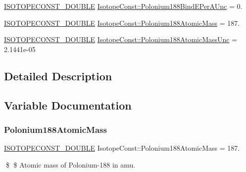 \begin{DoxyCompactItemize}
\mbox{\hyperlink{group___isotope_const-_macros_ga8f45a7272ce02c0b4c65c44636ed719a}{I\+S\+O\+T\+O\+P\+E\+C\+O\+N\+S\+T\+\_\+\+D\+O\+U\+B\+LE}} \mbox{\hyperlink{group___isotope_const-_polonium-_po188_ga11160d514e5717e0207f0b3419f30ae1}{Isotope\+Const\+::\+Polonium188\+Bind\+E\+Per\+A\+Unc}} = 0.
\item 
\mbox{\hyperlink{group___isotope_const-_macros_ga8f45a7272ce02c0b4c65c44636ed719a}{I\+S\+O\+T\+O\+P\+E\+C\+O\+N\+S\+T\+\_\+\+D\+O\+U\+B\+LE}} \mbox{\hyperlink{group___isotope_const-_polonium-_po188_ga9f07adc921625762b4d1d325d576fac6}{Isotope\+Const\+::\+Polonium188\+Atomic\+Mass}} = 187.
\item 
\mbox{\hyperlink{group___isotope_const-_macros_ga8f45a7272ce02c0b4c65c44636ed719a}{I\+S\+O\+T\+O\+P\+E\+C\+O\+N\+S\+T\+\_\+\+D\+O\+U\+B\+LE}} \mbox{\hyperlink{group___isotope_const-_polonium-_po188_ga6f831f0b8b53b4d3debe7c4c7ba841dd}{Isotope\+Const\+::\+Polonium188\+Atomic\+Mass\+Unc}} = 2.\+1441e-\/05
\end{DoxyCompactItemize}


\subsection{Detailed Description}


\subsection{Variable Documentation}
\mbox{\label{group___isotope_const-_polonium-_po188_ga9f07adc921625762b4d1d325d576fac6}} 
\subsubsection{\texorpdfstring{Polonium188\+Atomic\+Mass}{Polonium188AtomicMass}}
{\footnotesize\ttfamily \mbox{\hyperlink{group___isotope_const-_macros_ga8f45a7272ce02c0b4c65c44636ed719a}{I\+S\+O\+T\+O\+P\+E\+C\+O\+N\+S\+T\+\_\+\+D\+O\+U\+B\+LE}} Isotope\+Const\+::\+Polonium188\+Atomic\+Mass = 187.}

\$ \$ Atomic mass of Polonium-\/188 in amu. \mbox{\label{group___isotope_const-_polonium-_po188_ga6f831f0b8b53b4d3debe7c4c7ba841dd}} 
